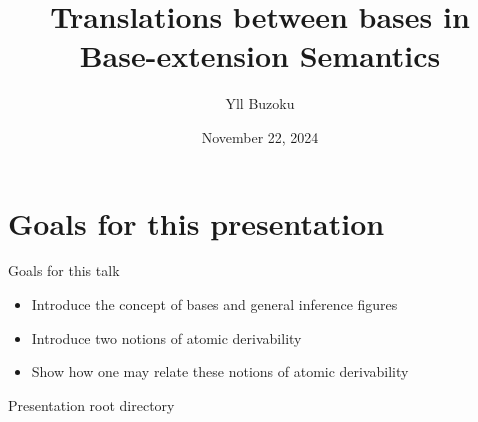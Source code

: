 \documentclass{beamer}
\title[Translations between bases in B-eS]{Translations between bases in Base-extension Semantics}
\author{Yll Buzoku}
\institute[UCL]{%
  Department of Computer Science \\ %
  University College London
}
\date{November 22, 2024}
\begin{document}
\begin{frame}
\titlepage
\end{frame}
\section*{Goals for this presentation}
\begin{frame}{Goals for this talk}
\begin{itemize}
\item Introduce the concept of bases and general inference figures
\item Introduce two notions of atomic derivability
\item Show how one may relate these notions of atomic derivability
\end{itemize}
\end{frame}
\begin{frame}{Presentation root directory}
\tableofcontents
\end{frame}
\end{document}
